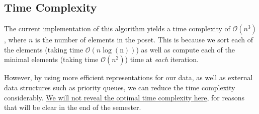 \documentclass{article}
\begin{document}
\subsection*{Time Complexity}
    The current implementation of this algorithm yields a time complexity of $\mathcal{O}(n^{3})$, where $n$ is the number of elements in the poset. This is because we sort each of the elements (taking time $\mathcal{O}(n\log(\text{n}))$) as well as compute each of the minimal elements (taking time $\mathcal{O}(n^{2})$) time at \textit{each} iteration.

    \vspace{2mm}
    However, by using more efficient representations for our data, as well as external data structures such as priority queues, we can reduce the time complexity considerably. \underline{We will not reveal the optimal time complexity here}, for reasons that will be clear in the end of the semester.
\end{document}
